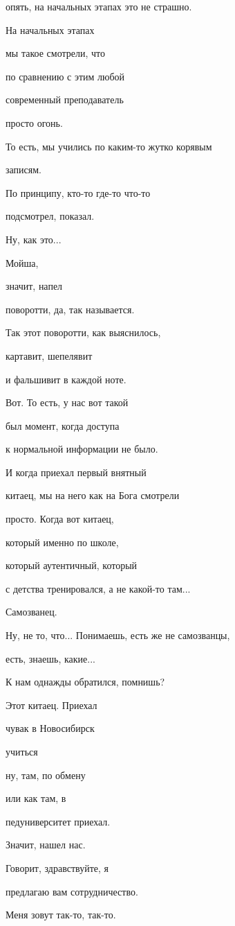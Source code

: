 опять, на начальных этапах это не страшно.

На начальных этапах

мы такое смотрели, что

по сравнению с этим любой

современный преподаватель

просто огонь.

То есть, мы учились по каким-то жутко корявым

записям.

По принципу, кто-то где-то что-то

подсмотрел, показал.

Ну, как это...

Мойша,

значит, напел

поворотти, да, так называется.

Так этот поворотти, как выяснилось,

картавит, шепелявит

и фальшивит в каждой ноте.

Вот. То есть, у нас вот такой

был момент, когда доступа

к нормальной информации не было.

И когда приехал первый внятный

китаец, мы на него как на Бога смотрели

просто. Когда вот китаец,

который именно по школе,

который аутентичный, который

с детства тренировался, а не какой-то там...

Самозванец.

Ну, не то, что... Понимаешь, есть же не самозванцы,

есть, знаешь, какие...

К нам однажды обратился, помнишь?

Этот китаец. Приехал

чувак в Новосибирск

учиться

ну, там, по обмену

или как там, в

педуниверситет приехал.

Значит, нашел нас.

Говорит, здравствуйте, я

предлагаю вам сотрудничество.

Меня зовут так-то, так-то.

